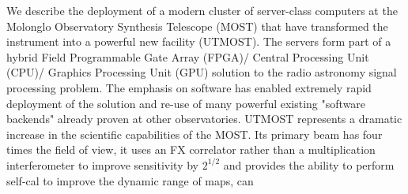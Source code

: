We describe the deployment of a modern cluster of server-class computers at the Molonglo Observatory Synthesis Telescope (MOST) that have transformed the instrument into a powerful new facility (UTMOST). The servers form part of a hybrid Field Programmable Gate Array (FPGA)/ Central Processing Unit (CPU)/ Graphics Processing Unit (GPU) solution to the radio astronomy signal processing problem. The emphasis on software has enabled extremely rapid deployment of the solution and re-use of many powerful existing "software backends" already proven at other observatories. UTMOST represents a dramatic increase in the scientific capabilities of the MOST. Its primary beam has four times the field of view, it uses an FX correlator rather than a multiplication interferometer to improve sensitivity by $2^{1/2}$ and provides the ability to perform self-cal to improve the dynamic range of maps, can 
